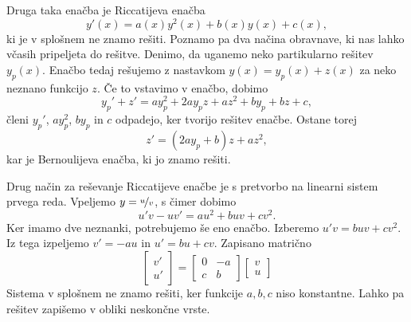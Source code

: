 
Druga taka enačba je Riccatijeva enačba
\[
  y'(x) = a(x) y^2(x) + b(x) y(x) + c(x),
\]
ki je v splošnem ne znamo rešiti.
Poznamo pa dva načina obravnave, ki nas lahko včasih pripeljeta do rešitve.
Denimo, da uganemo neko partikularno rešitev $y_p(x)$.
Enačbo tedaj rešujemo z nastavkom $y(x) = y_p(x) + z(x)$ za neko neznano
funkcijo $z$.
Če to vstavimo v enačbo, dobimo
\[
  y_p' + z' = a y_p^2 + 2 a y_p z + a z^2 + b y_p + bz + c,
\]
členi $y_p'$, $a y_p^2$, $b y_p$ in $c$ odpadejo, ker tvorijo rešitev enačbe.
Ostane torej
\[
  z' = (2a y_p + b) z + a z^2,
\]
kar je Bernoulijeva enačba, ki jo znamo rešiti.

Drug način za reševanje Riccatijeve enačbe je s pretvorbo na linearni sistem
prvega reda.
Vpeljemo $y = \nicefrac{u}{v}$, s čimer dobimo
\[
  u'v - uv' = au^2 + buv + cv^2.
\]
Ker imamo dve neznanki, potrebujemo še eno enačbo.
Izberemo $u'v = buv + cv^2$.
Iz tega izpeljemo $v' = - a u$ in $u' = bu + cv$.
Zapisano matrično
\[
  \begin{bmatrix}
	v' \\ u'
  \end{bmatrix}
  =
  \begin{bmatrix}
	0 & -a \\
	c & b
  \end{bmatrix}
  \begin{bmatrix}
	v \\ u
  \end{bmatrix}
\]
Sistema v splošnem ne znamo rešiti, ker funkcije $a, b, c$ niso konstantne.
Lahko pa rešitev zapišemo v obliki neskončne vrste.

